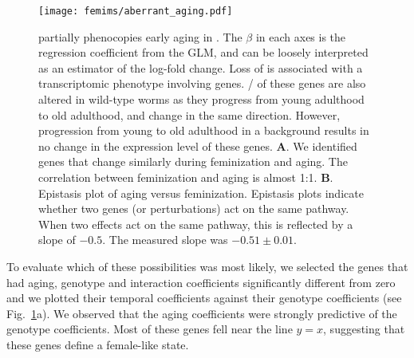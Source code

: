 \begin{figure}
  \renewcommand{\familydefault}{\sfdefault}\normalfont{}
  \centering
  \texttt{[image: femims/aberrant\_aging.pdf]}
  \caption{
    \fog{} partially phenocopies early aging in \cel{}. The $\beta$ in each axes
    is the regression coefficient from the GLM, and can be loosely interpreted
    as an estimator of the log-fold change. Loss of  is
    associated with a transcriptomic phenotype involving \fogn{} genes.
    \intersectn{}/\fogn{} of these genes are also altered in wild-type worms as
    they progress from young adulthood to old adulthood, and \coexpressed{}
    change in the same direction. However, progression from young to old
    adulthood in a \fog{} background results in no change in the expression
    level of these genes.
    \textbf{A}. We identified genes that change similarly
    during feminization and aging. The correlation between feminization and
    aging is almost 1:1.
    \textbf{B}. Epistasis plot of aging versus feminization.
    Epistasis plots indicate whether two genes (or perturbations) act on the
    same pathway. When two effects act on the same pathway, this is reflected by
    a slope of $-0.5$. The measured slope was $-0.51 \pm 0.01$.
  }%
\label{fig:aberrant_aging}
\end{figure}

To evaluate which of these possibilities was most likely, we selected the
\intersectn{} genes that had aging, genotype and interaction coefficients
significantly different from zero and we plotted their temporal coefficients
against their genotype coefficients (see Fig.~\ref{fig:aberrant_aging}a). We
observed that the aging coefficients were strongly predictive of the genotype
coefficients. Most of these genes fell near the line $y=x$, suggesting that
these genes define a female-like state.

